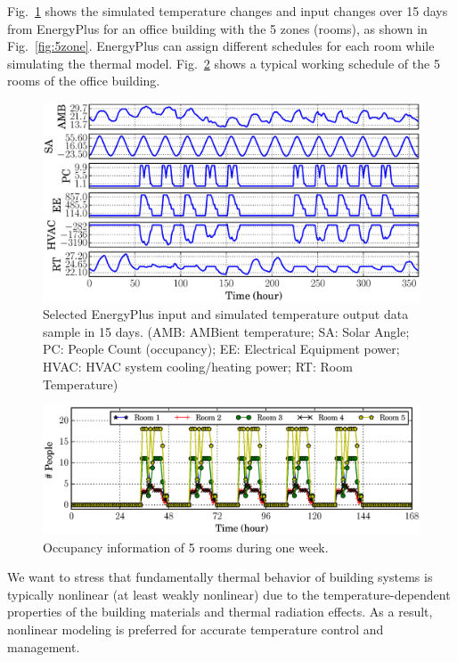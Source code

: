 Fig.~\ref{fig:energyplus-io-curve} shows the simulated temperature changes and
input changes over 15 days from EnergyPlus for an office building with the 5 zones
(rooms), as shown in Fig.~\ref{fig:5zone}. EnergyPlus can assign different schedules
for each room while simulating the thermal model.
Fig.~\ref{fig:occupancy-curve} shows a typical working schedule of the 5 rooms
of the office building.

\begin{figure}[t]
    \includegraphics[width=0.9\columnwidth]{figs/energyplus_review/energyplus}
    \caption{Selected EnergyPlus input and simulated temperature output data sample in
        15 days.  (AMB: AMBient temperature; SA: Solar Angle; PC: People Count
        (occupancy); EE: Electrical Equipment power; HVAC: HVAC system
        cooling/heating power; RT: Room Temperature)}
    \label{fig:energyplus-io-curve}
\end{figure}
\begin{figure}[t]
\centering
\includegraphics[width=0.9\columnwidth]{figs/energyplus_review/occupancy}
\caption{Occupancy information of 5 rooms during one week.}
\label{fig:occupancy-curve}
\end{figure}

We want to stress that fundamentally thermal behavior of building
systems is typically nonlinear (at least weakly nonlinear) due to the
temperature-dependent properties of the building materials and thermal
radiation effects. As a
result, nonlinear modeling is preferred for accurate temperature
control and management.